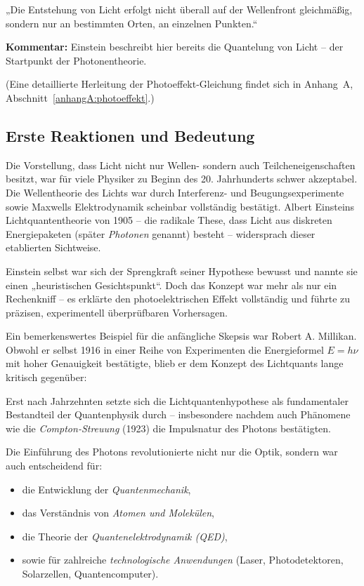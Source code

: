 \begin{tcolorbox}[physikbox, title={Einstein (1905)\cite{einstein_lichtquanten}}]
	\label{box:einstein-lichtquant}
	„Die Entstehung von Licht erfolgt nicht überall auf der Wellenfront gleichmäßig, sondern nur an bestimmten Orten, an einzelnen Punkten.“\
	
	
	\textbf{Kommentar:} Einstein beschreibt hier bereits die Quantelung von Licht – der Startpunkt der Photonentheorie.
\end{tcolorbox}
\medskip
{}
(Eine detaillierte Herleitung der Photoeffekt-Gleichung findet sich in Anhang~A, Abschnitt~\ref{anhangA:photoeffekt}.)
\subsection{Erste Reaktionen und Bedeutung}

Die Vorstellung, dass Licht nicht nur Wellen- sondern auch Teilcheneigenschaften besitzt, war für viele Physiker zu Beginn des 20. Jahrhunderts schwer akzeptabel. Die Wellentheorie des Lichts war durch Interferenz- und Beugungsexperimente sowie Maxwells Elektrodynamik scheinbar vollständig bestätigt. Albert Einsteins Lichtquantentheorie von 1905 – die radikale These, dass Licht aus diskreten Energiepaketen (später \emph{Photonen} genannt) besteht – widersprach dieser etablierten Sichtweise.

Einstein selbst war sich der Sprengkraft seiner Hypothese bewusst und nannte sie einen „heuristischen Gesichtspunkt“. Doch das Konzept war mehr als nur ein Rechenkniff – es erklärte den photoelektrischen Effekt vollständig und führte zu präzisen, experimentell überprüfbaren Vorhersagen.

Ein bemerkenswertes Beispiel für die anfängliche Skepsis war Robert A. Millikan. Obwohl er selbst 1916 in einer Reihe von Experimenten die Energieformel \( E = h \nu \) mit hoher Genauigkeit bestätigte, blieb er dem Konzept des Lichtquants lange kritisch gegenüber:

Erst nach Jahrzehnten setzte sich die Lichtquantenhypothese als fundamentaler Bestandteil der Quantenphysik durch – insbesondere nachdem auch Phänomene wie die \emph{Compton-Streuung} (1923) die Impulsnatur des Photons bestätigten.

Die Einführung des Photons revolutionierte nicht nur die Optik, sondern war auch entscheidend für:
\begin{itemize}
	\item die Entwicklung der \emph{Quantenmechanik},
	\item das Verständnis von \emph{Atomen und Molekülen},
	\item die Theorie der \emph{Quantenelektrodynamik (QED)},
	\item sowie für zahlreiche \emph{technologische Anwendungen} (Laser, Photodetektoren, Solarzellen, Quantencomputer).
\end{itemize}

